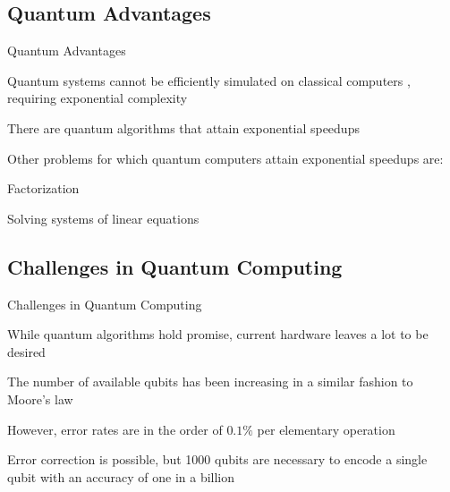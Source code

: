 \documentclass[professionalfonts]{beamer}
\newcommand{\SubItem}[1]{
    {\setlength\itemindent{15pt} \item[*] #1}
}
\begin{document}




\subsection{\textbf{Quantum Advantages}}
\begin{frame}{Quantum Advantages}
	\begin{itemize}
		\item Quantum systems cannot be efficiently simulated on classical computers \citep{feynman}, requiring exponential complexity
		\SubItem{There are quantum algorithms \citep{quantumsimulation} that attain exponential speedups}
		\item Other problems for which quantum computers attain exponential speedups are:
			\SubItem{Factorization \citep{shor}}
			\SubItem{Solving systems of linear equations \citep{harrow}}
	\end{itemize}
\end{frame}



\subsection{\textbf{Challenges in Quantum Computing}}

\begin{frame}{Challenges in Quantum Computing}
	\begin{itemize}
		\item While quantum algorithms hold promise, current hardware leaves a lot to be desired
		\item The number of available qubits has been increasing in a similar fashion to Moore's law \citep{moorequantum}
			\SubItem{However, error rates are in the order of $0.1\%$ per elementary operation \citep{ibmblog}}
			\SubItem{Error correction is possible, but 1000 qubits are necessary to encode a single qubit with an accuracy of one in a billion \citep{moorequantum}}
	\end{itemize}
\end{frame}
\end{document}
